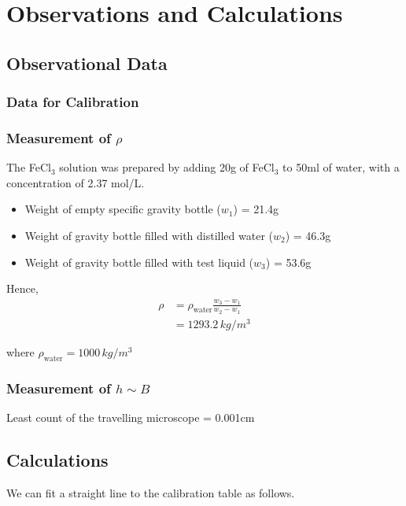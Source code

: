 \section{Observations and Calculations}

\subsection{Observational Data}
    
    \subsubsection{Data for Calibration}
    
        
    
    \subsubsection{Measurement of $\rho$}

    The FeCl$_3$ solution was prepared by adding 20g of FeCl$_3$ to 50ml of water, with a concentration of 2.37 mol/L.
    \begin{itemize}
        \item Weight of empty specific gravity bottle ($w_1$) = 21.4g
        \item Weight of gravity bottle filled with distilled water ($w_2$) = 46.3g
        \item Weight of gravity bottle filled with test liquid ($w_3$) = 53.6g
    \end{itemize}
    Hence, 
    \begin{align*}
        \rho &= \rho_\text{water}\frac{w_3-w_1}{w_2-w_1}\\
        &=1293.2\,kg/m^3
    \end{align*}

    where $\rho_\text{water} = 1000\,kg/m^3$ 
    
    \subsubsection{Measurement of $h\sim B$}
    Least count of the travelling microscope = 0.001cm
        

\subsection{Calculations}
    We can fit a straight line to the calibration table as follows.

